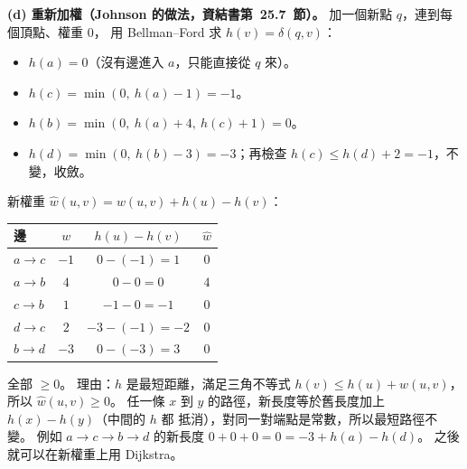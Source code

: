 \begin{pastsoln}
\textbf{(d) 重新加權（Johnson 的做法，資結書第~25.7~節）。} 加一個新點 $q$，連到每個頂點、權重 $0$，
用 Bellman--Ford 求 $h(v) = \delta(q, v)$：
\begin{itemize}
\item $h(a) = 0$（沒有邊進入 $a$，只能直接從 $q$ 來）。
\item $h(c) = \min(0,\ h(a) - 1) = -1$。
\item $h(b) = \min(0,\ h(a) + 4,\ h(c) + 1) = 0$。
\item $h(d) = \min(0,\ h(b) - 3) = -3$；再檢查 $h(c) \le h(d) + 2 = -1$，不變，收斂。
\end{itemize}
新權重 $\hat w(u, v) = w(u, v) + h(u) - h(v)$：
\begin{center}
\begin{tabular}{lccc}
\toprule
邊 & $w$ & $h(u) - h(v)$ & $\hat w$ \\
\midrule
$a \to c$ & $-1$ & $0 - (-1) = 1$ & $0$ \\
$a \to b$ & $4$ & $0 - 0 = 0$ & $4$ \\
$c \to b$ & $1$ & $-1 - 0 = -1$ & $0$ \\
$d \to c$ & $2$ & $-3 - (-1) = -2$ & $0$ \\
$b \to d$ & $-3$ & $0 - (-3) = 3$ & $0$ \\
\bottomrule
\end{tabular}
\end{center}
全部 $\ge 0$。 理由：$h$ 是最短距離，滿足三角不等式 $h(v) \le h(u) + w(u, v)$，所以
$\hat w(u, v) \ge 0$。 任一條 $x$ 到 $y$ 的路徑，新長度等於舊長度加上 $h(x) - h(y)$（中間的 $h$ 都
抵消），對同一對端點是常數，所以最短路徑不變。 例如 $a \to c \to b \to d$ 的新長度
$0 + 0 + 0 = 0 = -3 + h(a) - h(d)$。 之後就可以在新權重上用 Dijkstra。
\end{pastsoln}
